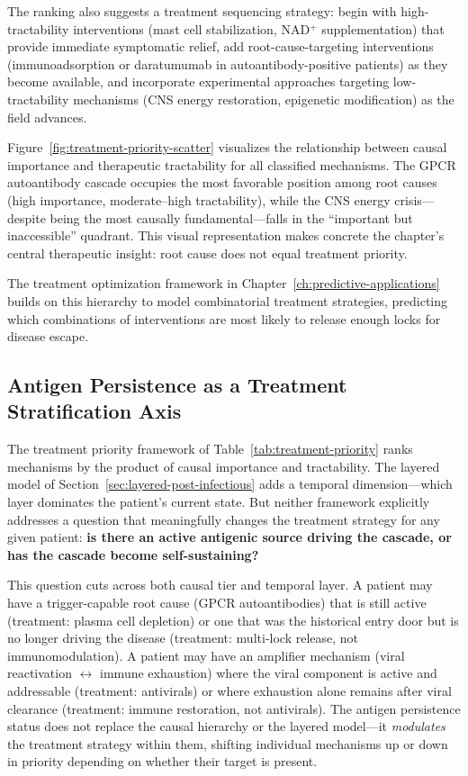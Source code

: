 The ranking also suggests a treatment sequencing strategy: begin with high-tractability interventions (mast cell stabilization, NAD$^+$ supplementation) that provide immediate symptomatic relief, add root-cause-targeting interventions (immunoadsorption or daratumumab in autoantibody-positive patients) as they become available, and incorporate experimental approaches targeting low-tractability mechanisms (CNS energy restoration, epigenetic modification) as the field advances.

Figure~\ref{fig:treatment-priority-scatter} visualizes the relationship between causal importance and therapeutic tractability for all classified mechanisms. The GPCR autoantibody cascade occupies the most favorable position among root causes (high importance, moderate--high tractability), while the CNS energy crisis---despite being the most causally fundamental---falls in the ``important but inaccessible'' quadrant. This visual representation makes concrete the chapter's central therapeutic insight: root cause does not equal treatment priority.



The treatment optimization framework in Chapter~\ref{ch:predictive-applications} builds on this hierarchy to model combinatorial treatment strategies, predicting which combinations of interventions are most likely to release enough locks for disease escape.


\subsection{Antigen Persistence as a Treatment Stratification Axis}
\label{sec:antigen-stratification}

The treatment priority framework of Table~\ref{tab:treatment-priority} ranks mechanisms by the product of causal importance and tractability. The layered model of Section~\ref{sec:layered-post-infectious} adds a temporal dimension---which layer dominates the patient's current state. But neither framework explicitly addresses a question that meaningfully changes the treatment strategy for any given patient: \textbf{is there an active antigenic source driving the cascade, or has the cascade become self-sustaining?}

This question cuts across both causal tier and temporal layer. A patient may have a trigger-capable root cause (GPCR autoantibodies) that is still active (treatment: plasma cell depletion) or one that was the historical entry door but is no longer driving the disease (treatment: multi-lock release, not immunomodulation). A patient may have an amplifier mechanism (viral reactivation $\leftrightarrow$ immune exhaustion) where the viral component is active and addressable (treatment: antivirals) or where exhaustion alone remains after viral clearance (treatment: immune restoration, not antivirals). The antigen persistence status does not replace the causal hierarchy or the layered model---it \emph{modulates} the treatment strategy within them, shifting individual mechanisms up or down in priority depending on whether their target is present.


